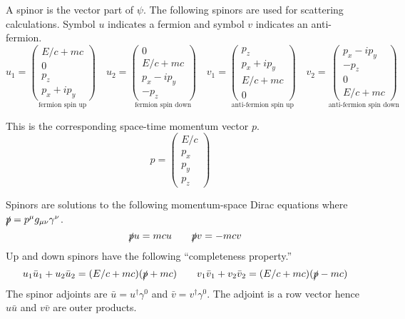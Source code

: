 \documentclass[12pt]{article}
\begin{document}
\noindent
A spinor is the vector part of $\psi$.
The following spinors are used for scattering calculations.
Symbol $u$ indicates a fermion and symbol $v$ indicates an anti-fermion.
\begin{equation*}
u_1=\underset{\text{fermion spin up}}{\begin{pmatrix}E/c+mc\\0\\p_z\\p_x+ip_y\end{pmatrix}}
\quad
u_2=\underset{\text{fermion spin down}}{\begin{pmatrix}0\\E/c+mc\\p_x-ip_y\\-p_z\end{pmatrix}}
\quad
v_1=\underset{\text{anti-fermion spin up}}{\begin{pmatrix}p_z\\p_x+ip_y\\E/c+mc\\0\end{pmatrix}}
\quad
v_2=\underset{\text{anti-fermion spin down}}{\begin{pmatrix}p_x-ip_y\\-p_z\\0\\E/c+mc\end{pmatrix}}
\end{equation*}

\noindent
This is the corresponding space-time momentum vector $p$.
$$
p=\begin{pmatrix}E/c\\p_x\\p_y\\p_z\end{pmatrix}\quad
$$

\noindent
Spinors are solutions to the following momentum-space Dirac equations where
$\slashed{p}=p^\mu g_{\mu\nu}\gamma^\nu$.
$$
\slashed{p}u=mcu\qquad\slashed{p}v=-mcv
$$
Up and down spinors have the following ``completeness property.''
$$
u_1\bar{u}_1+u_2\bar{u}_2=(E/c+mc)(\slashed{p}+mc)\qquad
v_1\bar{v}_1+v_2\bar{v}_2=(E/c+mc)(\slashed{p}-mc)
$$
The spinor adjoints are $\bar{u}=u^\dag\gamma^0$ and $\bar{v}=v^\dag\gamma^0$.
The adjoint is a row vector hence $u\bar{u}$ and $v\bar{v}$ are outer products.
\end{document}

